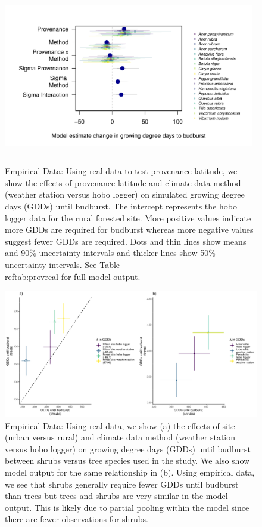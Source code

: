 \documentclass{article}\usepackage[]{graphicx}\usepackage[]{color}
\begin{document}
  
\begin{figure}[H]
      \centering
      \includegraphics[height=7cm, width=11cm]{..//analyses/figures/muplot_prov_real.pdf}
      \label{fig:muplotprov}
\caption{ Empirical Data: Using real data to test provenance latitude, we show the effects of provenance latitude and climate data method (weather station versus hobo logger) on simulated growing degree days (GDDs) until budburst. The intercept represents the hobo logger data for the rural forested site. More positive values indicate more GDDs are required for budburst whereas more negative values suggest fewer GDDs are required. Dots and thin lines show means and 90\% uncertainty intervals and thicker lines show 50\% uncertainty intervals. See Table \\ref{tab:provreal} for full model output.}
\label{fig:prov}
\end{figure}

\begin{figure}[H]
    \centering
    \includegraphics[width=16cm]{..//analyses/figures/functype.pdf}
\caption{ Empirical Data: Using real data, we show (a) the effects of site (urban versus rural) and climate data method (weather station versus hobo logger) on growing degree days (GDDs) until budburst between shrubs versus tree species used in the study. We also show model output for the same relationship in (b). Using empirical data, we see that shrubs generally require fewer GDDs until budburst than trees but trees and shrubs are very similar in the model output. This is likely due to partial pooling within the model since there are fewer observations for shrubs.}
\label{fig:funcs}
\end{figure}
\end{document}
